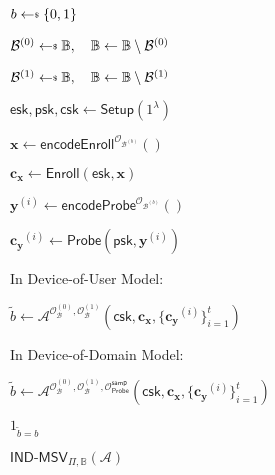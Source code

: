 \begin{figure}[h]
\centering

	\begin{minipage}[t]{0.6\textwidth}
	\begin{algorithm}[H]
	\caption{$\textsf{IND-MSV}_{\Pi, \mathbb{B}}(\mathcal{A})$}
	\label{alg:ind-msv_game}
	\begin{algorithmic}[1]
		\State $b \getsdollar \{0, 1\}$

		\State $\mathcal{B}^{(0)} \getsdollar \mathbb{B}, \quad \mathbb{B} \gets \mathbb{B} \setminus \mathcal{B}^{(0)}$

		\State $\mathcal{B}^{(1)} \getsdollar \mathbb{B}, \quad \mathbb{B} \gets \mathbb{B} \setminus \mathcal{B}^{(1)}$

		\State $\textsf{esk}, \textsf{psk}, \textsf{csk} \gets \textsf{Setup}(1^\lambda)$

		\State $\mathbf{x} \gets \textsf{encodeEnroll}^{\mathcal{O}_{\mathcal{B}^{(b)}}}()$

		\State $\mathbf{c_x} \gets \textsf{Enroll}(\textsf{esk}, \mathbf{x})$


			\State $\mathbf{y}^{(i)} \gets \textsf{encodeProbe}^{\mathcal{O}_{\mathcal{B}^{(b)}}}() $
		
			\State $\mathbf{c_y}^{(i)} \gets \textsf{Probe}( \textsf{psk}, \mathbf{y}^{(i)} )$

		\EndFor

		\State In Device-of-User Model:
		
			\State \hspace{\algorithmicindent} $\tilde{b} \gets \mathcal{A}^{\mathcal{O}_\mathcal{B}^{(0)}, \mathcal{O}_\mathcal{B}^{(1)}} ( \textsf{csk}, \mathbf{c_x}, \{ \mathbf{c_y}^{(i)} \}_{i=1}^t )$

		\State In Device-of-Domain Model:
		
			\State \hspace{\algorithmicindent} $\tilde{b} \gets \mathcal{A}^{\mathcal{O}_\mathcal{B}^{(0)}, \mathcal{O}_\mathcal{B}^{(1)}, \mathcal{O}_{\textsf{Probe}}^{\textsf{samp}}} ( \textsf{csk}, \mathbf{c_x}, \{ \mathbf{c_y}^{(i)} \}_{i=1}^t )$

		\State \Return $1_{\tilde{b} = b}$
	\end{algorithmic}
	\end{algorithm}
	\end{minipage}

\label{fig:ind-msv_game}
\end{figure}


